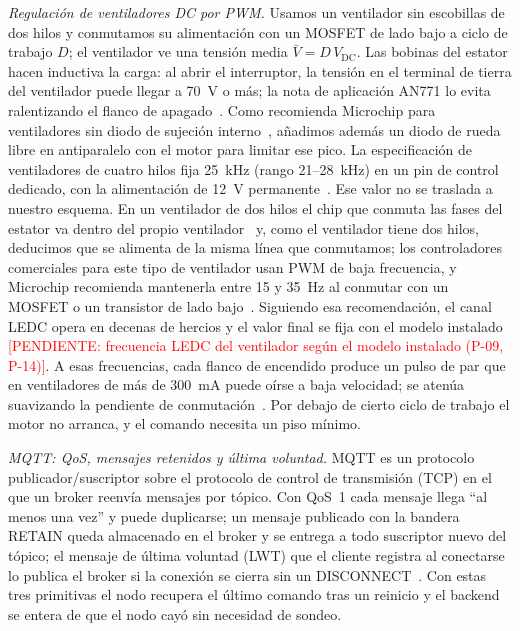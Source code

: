 \documentclass[manuscript,screen,nonacm,natbib=false]{acmart}
\newcommand{\pendiente}[1]{\textcolor{red}{[PENDIENTE: #1]}}
\begin{document}
\textit{Regulación de ventiladores DC por PWM.} Usamos un ventilador sin escobillas de dos hilos y conmutamos su alimentación con un MOSFET de lado bajo a ciclo de trabajo $D$; el ventilador ve una tensión media $\bar V = D\,V_{\mathrm{DC}}$. Las bobinas del estator hacen inductiva la carga: al abrir el interruptor, la tensión en el terminal de tierra del ventilador puede llegar a 70~V o más; la nota de aplicación AN771 lo evita ralentizando el flanco de apagado~\cite{gaede2003an771}. Como recomienda Microchip para ventiladores sin diodo de sujeción interno~\cite{microchip2013tc646b}, añadimos además un diodo de rueda libre en antiparalelo con el motor para limitar ese pico. La especificación de ventiladores de cuatro hilos fija 25~kHz (rango 21--28~kHz) en un pin de control dedicado, con la alimentación de 12~V permanente~\cite{noctua2023pwm}. Ese valor no se traslada a nuestro esquema. En un ventilador de dos hilos el chip que conmuta las fases del estator va dentro del propio ventilador~\cite{gaede2003an771} y, como el ventilador tiene dos hilos, deducimos que se alimenta de la misma línea que conmutamos; los controladores comerciales para este tipo de ventilador usan PWM de baja frecuencia, y Microchip recomienda mantenerla entre 15 y 35~Hz al conmutar con un MOSFET o un transistor de lado bajo~\cite{microchip2013tc646b}. Siguiendo esa recomendación, el canal LEDC opera en decenas de hercios y el valor final se fija con el modelo instalado \pendiente{frecuencia LEDC del ventilador según el modelo instalado (P-09, P-14)}. A esas frecuencias, cada flanco de encendido produce un pulso de par que en ventiladores de más de 300~mA puede oírse a baja velocidad; se atenúa suavizando la pendiente de conmutación~\cite{gaede2003an771}. Por debajo de cierto ciclo de trabajo el motor no arranca, y el comando necesita un piso mínimo.

\textit{MQTT: QoS, mensajes retenidos y última voluntad.} MQTT es un protocolo publicador/suscriptor sobre el protocolo de control de transmisión (TCP) en el que un broker reenvía mensajes por tópico. Con QoS~1 cada mensaje llega ``al menos una vez'' y puede duplicarse; un mensaje publicado con la bandera RETAIN queda almacenado en el broker y se entrega a todo suscriptor nuevo del tópico; el mensaje de última voluntad (LWT) que el cliente registra al conectarse lo publica el broker si la conexión se cierra sin un DISCONNECT~\cite{mqtt311}. Con estas tres primitivas el nodo recupera el último comando tras un reinicio y el backend se entera de que el nodo cayó sin necesidad de sondeo.
\end{document}
